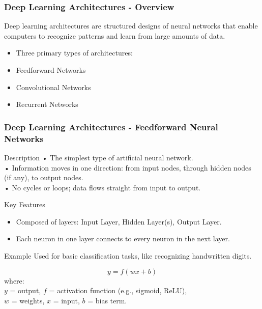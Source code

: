 \documentclass[aspectratio=169]{beamer}
\begin{document}
\begin{frame}[fragile]
    \frametitle{Deep Learning Architectures - Overview}
    Deep learning architectures are structured designs of neural networks that enable computers to recognize patterns and learn from large amounts of data.
    
    \begin{itemize}
        \item Three primary types of architectures:
        \item Feedforward Networks
        \item Convolutional Networks
        \item Recurrent Networks
    \end{itemize}
\end{frame}

\begin{frame}[fragile]
    \frametitle{Deep Learning Architectures - Feedforward Neural Networks}
    
    \begin{block}{Description}
        • The simplest type of artificial neural network. \\
        • Information moves in one direction: 
        from input nodes, through hidden nodes (if any), to output nodes. \\
        • No cycles or loops; data flows straight from input to output.
    \end{block}
    
    \begin{block}{Key Features}
        \begin{itemize}
            \item Composed of layers: Input Layer, Hidden Layer(s), Output Layer.
            \item Each neuron in one layer connects to every neuron in the next layer.
        \end{itemize}
    \end{block}
    
    \begin{block}{Example}
        Used for basic classification tasks, like recognizing handwritten digits.
    \end{block}
    
    \begin{equation}
        y = f(wx + b)
    \end{equation}
    where: \\
    \( y \) = output, \( f \) = activation function (e.g., sigmoid, ReLU), \\ 
    \( w \) = weights, \( x \) = input, \( b \) = bias term.
\end{frame}
\end{document}
